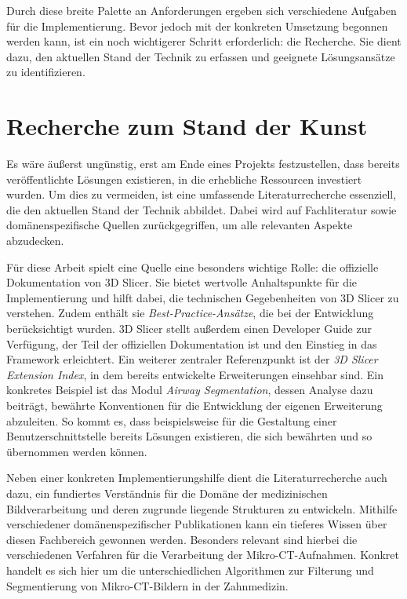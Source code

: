Durch diese breite Palette an Anforderungen ergeben sich verschiedene Aufgaben
für die Implementierung. Bevor jedoch mit der konkreten Umsetzung begonnen werden
kann, ist ein noch wichtigerer Schritt erforderlich: die Recherche. Sie dient
dazu, den aktuellen Stand der Technik zu erfassen und geeignete Lösungsansätze zu
identifizieren.

\section{Recherche zum Stand der Kunst}
Es wäre äußerst ungünstig, erst am Ende eines Projekts festzustellen, dass bereits
veröffentlichte Lösungen existieren, in die erhebliche Ressourcen investiert
wurden. Um dies zu vermeiden, ist eine umfassende Literaturrecherche essenziell,
die den aktuellen Stand der Technik abbildet. Dabei wird auf Fachliteratur sowie
domänenspezifische Quellen zurückgegriffen, um alle relevanten Aspekte abzudecken.

Für diese Arbeit spielt eine Quelle eine besonders wichtige Rolle: die
offizielle Dokumentation von 3D Slicer. Sie bietet wertvolle Anhaltspunkte für die
Implementierung und hilft dabei, die technischen Gegebenheiten von 3D Slicer zu
verstehen. Zudem enthält sie \textit{Best-Practice-Ansätze}, die bei der Entwicklung
berücksichtigt wurden. 3D Slicer stellt außerdem einen Developer Guide zur
Verfügung, der Teil der offiziellen Dokumentation ist und den Einstieg in das Framework
erleichtert. Ein weiterer zentraler Referenzpunkt ist der \textit{3D Slicer
Extension Index}, in dem bereits entwickelte Erweiterungen einsehbar sind. Ein konkretes
Beispiel ist das Modul \textit{Airway Segmentation}, dessen Analyse dazu beiträgt,
bewährte Konventionen für die Entwicklung der eigenen Erweiterung abzuleiten. So
kommt es, dass beispielsweise für die Gestaltung einer Benutzerschnittstelle
bereits Lösungen existieren, die sich bewährten und so übernommen werden können.

Neben einer konkreten Implementierungshilfe dient die Literaturrecherche auch dazu,
ein fundiertes Verständnis für die Domäne der medizinischen Bildverarbeitung und
deren zugrunde liegende Strukturen zu entwickeln. Mithilfe verschiedener domänenspezifischer
Publikationen kann ein tieferes Wissen über diesen Fachbereich gewonnen werden.
Besonders relevant sind hierbei die verschiedenen Verfahren für die Verarbeitung
der Mikro-\ac{CT}-Aufnahmen. Konkret handelt es sich hier um die
unterschiedlichen Algorithmen zur Filterung und Segmentierung von Mikro-\ac{CT}-Bildern
in der Zahnmedizin.

